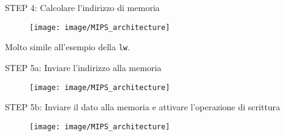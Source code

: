 \documentclass[../main.tex]{subfiles}
\begin{document}
    \newpage

    \begin{adjustwidth}{1cm}{1cm}
        STEP 4: Calcolare l'indirizzo di memoria \\
        
        \begin{figure}[h!]
            \centering

            \vspace*{5mm}
            \hspace*{1cm} \texttt{[image: image/MIPS\_architecture]}
            \vspace*{5mm}
        \end{figure}

        \noindent
        Molto simile all'esempio della \texttt{lw}. \\
    \end{adjustwidth}

    \vspace*{3mm}

    \begin{adjustwidth}{1cm}{1cm}
        STEP 5a: Inviare l'indirizzo alla memoria \\
        
        \begin{figure}[h!]
            \centering

            \vspace*{5mm}
            \hspace*{1cm} \texttt{[image: image/MIPS\_architecture]}
            \vspace*{5mm}
        \end{figure}
    \end{adjustwidth}

    \newpage

    \begin{adjustwidth}{1cm}{1cm}
        STEP 5b: Inviare il dato alla memoria e attivare
        l'operazione di scrittura \\
        
        \begin{figure}[h!]
            \centering

            \vspace*{5mm}
            \hspace*{1cm} \texttt{[image: image/MIPS\_architecture]}
            \vspace*{5mm}
        \end{figure}
    \end{adjustwidth}
\end{document}
